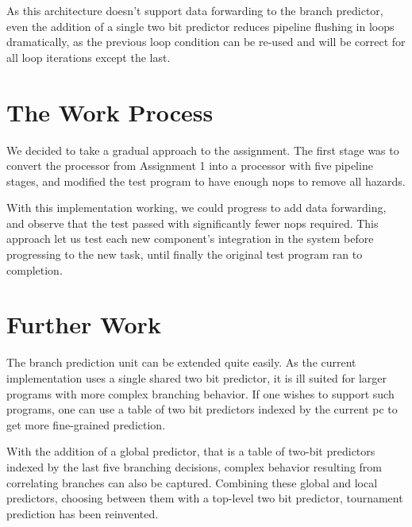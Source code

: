 As this architecture doesn't support data forwarding to the branch predictor, even the addition of a single two bit predictor reduces pipeline flushing in loops dramatically, as the previous loop condition can be re-used and will be correct for all loop iterations except the last.

\section{The Work Process}
We decided to take a gradual approach to the assignment.
The first stage was to convert the processor from Assignment 1 into a processor with five pipeline stages, and modified the test program to have enough nops to remove all hazards.

With this implementation working, we could progress to add data forwarding, and observe that the test passed with significantly fewer nops required.
This approach let us test each new component's integration in the system before progressing to the new task, until finally the original test program ran to completion.

\section{Further Work}

The branch prediction unit can be extended quite easily.
As the current implementation uses a single shared two bit predictor, it is ill suited for larger programs with more complex branching behavior.
If one wishes to support such programs, one can use a table of two bit predictors indexed by the current pc to get more fine-grained prediction.

With the addition of a global predictor, that is a table of two-bit predictors indexed by the last five branching decisions, complex behavior resulting from correlating branches can also be captured.
Combining these global and local predictors, choosing between them with a top-level two bit predictor, tournament prediction has been reinvented.
